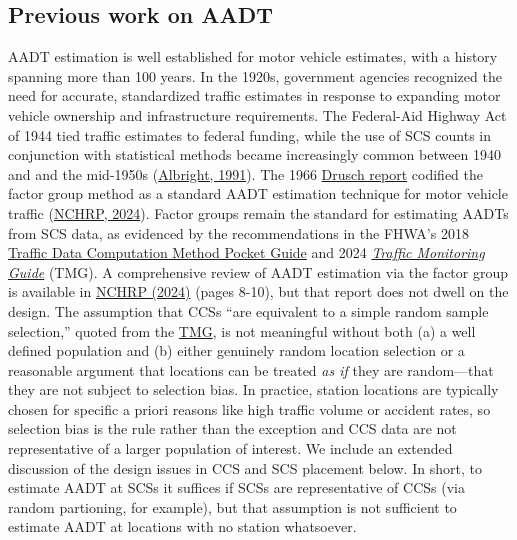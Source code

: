\documentclass[11pt]{article}
\begin{document}


    \subsection{Previous work on AADT}\label{previous-work-on-aadt}

AADT estimation is well established for motor vehicle estimates, with a
history spanning more than 100 years. In the 1920s, government agencies
recognized the need for accurate, standardized traffic estimates in
response to expanding motor vehicle ownership and infrastructure
requirements. The Federal-Aid Highway Act of 1944 tied traffic estimates
to federal funding, while the use of SCS counts in conjunction with
statistical methods became increasingly common between 1940 and and the
mid-1950s (\href{https://trid.trb.org/View/365623}{Albright, 1991}). The
1966
\href{https://onlinepubs.trb.org/Onlinepubs/hrr/1966/118/118-005.pdf}{Drusch
report} codified the factor group method as a standard AADT estimation
technique for motor vehicle traffic
(\href{https://nap.nationalacademies.org/catalog/27925/guide-on-methods-for-assigning-counts-to-adjustment-factor-groups}{NCHRP,
2024}). Factor groups remain the standard for estimating AADTs from SCS
data, as evidenced by the recommendations in the FHWA's 2018
\href{https://www.fhwa.dot.gov/policyinformation/pubs/pl18027_traffic_data_pocket_guide.pdf}{Traffic
Data Computation Method Pocket Guide} and 2024
\href{https://www.fhwa.dot.gov/policyinformation/tmguide/}{\emph{Traffic
Monitoring Guide}} (TMG). A comprehensive review of AADT estimation via
the factor group is available in
\href{https://nap.nationalacademies.org/catalog/27925/guide-on-methods-for-assigning-counts-to-adjustment-factor-groups}{NCHRP
(2024)} (pages 8-10), but that report does not dwell on the design. The
assumption that CCSs ``are equivalent to a simple random sample
selection,'' quoted from the
\href{https://www.fhwa.dot.gov/policyinformation/tmguide/}{TMG}, is not
meaningful without both (a) a well defined population and (b) either
genuinely random location selection or a reasonable argument that
locations can be treated \emph{as if} they are random---that they are
not subject to selection bias. In practice, station locations are
typically chosen for specific a priori reasons like high traffic volume
or accident rates, so selection bias is the rule rather than the
exception and CCS data are not representative of a larger population of
interest. We include an extended discussion of the design issues in CCS
and SCS placement below. In short, to estimate AADT at SCSs it suffices
if SCSs are representative of CCSs (via random partioning, for example),
but that assumption is not sufficient to estimate AADT at locations with
no station whatsoever.
\end{document}
